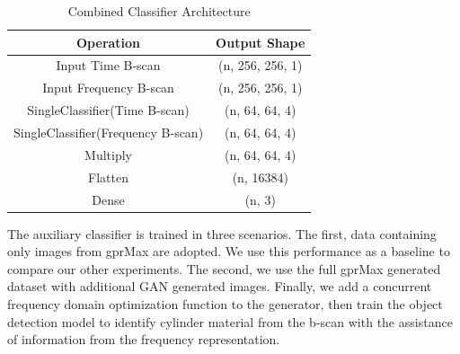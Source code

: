 \begin{center}
    \begin{table}[H]
        \centering
        \begin{tabular}{c|c}
            Operation & Output Shape \\
            \hline
            Input Time B-scan & (n, 256, 256, 1)\\
            Input Frequency B-scan & (n, 256, 256, 1)\\
            SingleClassifier(Time B-scan) & (n, 64, 64, 4)\\
            SingleClassifier(Frequency B-scan) & (n, 64, 64, 4)\\
            Multiply & (n, 64, 64, 4)\\
            Flatten & (n, 16384) \\
            Dense & (n, 3) \\
        \end{tabular}
        \caption{Combined Classifier Architecture}
        \label{tab:combined_classifier}
    \end{table}
\end{center}
The auxiliary classifier is trained in three scenarios. The first, data containing only images from gprMax are adopted. We use this performance as a baseline to compare our other experiments. The second, we use the full gprMax generated dataset with additional GAN generated images. Finally, we add a concurrent frequency domain optimization function to the generator, then train the object detection model to identify cylinder material from the b-scan with the assistance of information from the frequency representation.